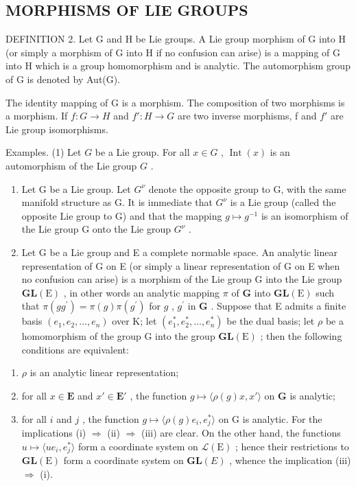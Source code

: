 \subsection{MORPHISMS OF LIE GROUPS}

DEFINITION 2. Let G and H be Lie groups. A Lie group morphism of G into H (or simply a morphism of G into H if no confusion can arise) is a mapping of G into H which is a group homomorphism and is analytic. The automorphism group of G is denoted by Aut(G).

The identity mapping of G is a morphism. The composition of two morphisms is a morphism. If \(f: G \to H\) and \(f': H \to G\) are two inverse morphisms, f and \(f'\) are Lie group isomorphisms.

Examples. (1) Let \(G\) be a Lie group. For all \(x \in G\) , \(\operatorname{Int}(x)\) is an automorphism of the Lie group \(G\) .

\begin{enumerate}
\def\labelenumi{(\arabic{enumi})}
\setcounter{enumi}{1}
\item
  Let G be a Lie group. Let \(G^{\nu}\) denote the opposite group to G, with the same manifold structure as G. It is immediate that \(G^{\nu}\) is a Lie group (called the opposite Lie group to G) and that the mapping \(g \mapsto g^{-1}\) is an isomorphism of the Lie group G onto the Lie group \(G^{\nu}\) .
\item
  Let G be a Lie group and E a complete normable space. An analytic linear representation of G on E (or simply a linear representation of G on E when no confusion can arise) is a morphism of the Lie group G into the Lie group \(\mathbf{GL}(\mathrm{E})\) , in other words an analytic mapping \(\pi\) of \(\mathbf{G}\) into \(\mathbf{GL}(\mathrm{E})\) such that \(\pi (gg^{\prime}) = \pi (g)\pi (g^{\prime})\) for \(g\) , \(g^{\prime}\) in \(\mathbf{G}\) . Suppose that E admits a finite basis \((e_1,e_2,\ldots ,e_n)\) over K; let \((e_1^*,e_2^*,\dots ,e_n^*)\) be the dual basis; let \(\rho\) be a homomorphism of the group G into the group \(\mathbf{GL}(\mathrm{E})\) ; then the following conditions are equivalent:
\end{enumerate}

\begin{enumerate}
\def\labelenumi{(\roman{enumi})}
\item
  \(\rho\) is an analytic linear representation;
\item
  for all \(x \in \mathbf{E}\) and \(x' \in \mathbf{E}'\) , the function \(g \mapsto \langle \rho(g)x, x' \rangle\) on \(\mathbf{G}\) is analytic;
\item
  for all \(i\) and \(j\) , the function \(g \mapsto \langle \rho(g)e_i, e_j^*\rangle\) on G is analytic. For the implications (i) \(\Rightarrow\) (ii) \(\Rightarrow\) (iii) are clear. On the other hand, the functions \(u \mapsto \langle ue_i, e_j^*\rangle\) form a coordinate system on \(\mathcal{L}(\mathrm{E})\) ; hence their restrictions to \(\mathbf{GL}(\mathrm{E})\) form a coordinate system on \(\mathbf{GL}(E)\) , whence the implication (iii) \(\Rightarrow\) (i).
\end{enumerate}

